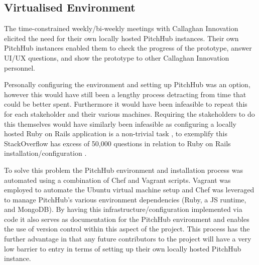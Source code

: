 \subsection{Virtualised Environment}
The time-constrained weekly/bi-weekly meetings with Callaghan Innovation elicited the need for their own locally hosted PitchHub instances. Their own PitchHub instances enabled them to check the progress of the prototype, answer UI/UX questions, and show the prototype to other Callaghan Innovation personnel. 
\par
Personally configuring the environment and setting up PitchHub was an option, however this would have still been a lengthy process detracting from time that could be better spent. Furthermore it would have been infeasible to repeat this for each stakeholder and their various machines. Requiring the stakeholders to do this themselves would have similarly been infeasible as configuring a locally hosted Ruby on Rails application is a non-trivial task \cite{Roma:personalCommunications}, to exemplify this StackOverflow has excess of 50,000 questions in relation to Ruby on Rails installation/configuration \cite{StackOverflowProblem1:online, StackOverflowProblem2:online, StackOverflowProblem3:online, StackOverflowProblem4:online}.
\par
To solve this problem the PitchHub environment and installation process was automated using a combination of Chef and Vagrant scripts. Vagrant was employed to automate the Ubuntu virtual machine setup and Chef was leveraged to manage PitchHub's various environment dependencies (Ruby, a JS runtime, and MongoDB). By having this infrastructure/configuration implemented via code it also serves as documentation for the PitchHub environment and enables the use of version control within this aspect of the project. This process has the further advantage in that any future contributors to the project will have a very low barrier to entry in terms of setting up their own locally hosted PitchHub instance.

